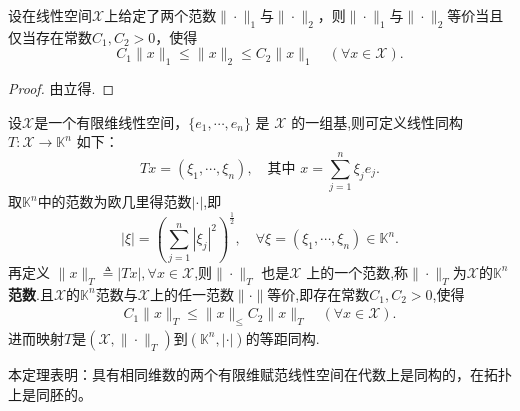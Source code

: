 \documentclass[../../main.tex]{subfiles}%
\begin{document}
\begin{corollary}\label{corollary:范数等价的充要条件}
设在线性空间$\mathscr{X}$上给定了两个范数$\|\cdot\|_1$与$\|\cdot\|_2$，则$\|\cdot\|_1$与$\|\cdot\|_2$等价当且仅当存在常数$C_1,C_2>0$，使得
$$C_1\|x\|_1 \leqslant \|x\|_2 \leqslant C_2\|x\|_1 \quad (\forall x \in \mathscr{X}).$$
\end{corollary}
\begin{proof}
由立得.
\end{proof}

\begin{theorem}\label{theorem:有限维赋范线性空间的范数都等价}
设$\mathscr{X}$是一个有限维线性空间，$\{e_1,\cdots,e_n\}$ 是 $\mathscr{X}$ 的一组基,则可定义线性同构 $T:\mathscr{X}\to\mathbb{K}^n$ 如下：
\[
T x = (\xi_1,\cdots,\xi_n),\quad \text{其中 } x = \sum_{j=1}^n \xi_j e_j.
\]
取$\mathbb{K}^n$中的范数为欧几里得范数$|\cdot|$,即
\[
|\xi| = \left(\sum_{j=1}^n |\xi_j|^2\right)^{\frac{1}{2}},\quad \forall \xi = (\xi_1,\cdots,\xi_n)\in\mathbb{K}^n.
\]
再定义 $\|x\|_T \triangleq |Tx|,\forall x\in \mathscr{X}$,则$\|\cdot\|_T$ 也是$\mathscr{X}$ 上的一个范数,称$\|\cdot\|_T$为$\mathscr{X}$的$\mathbb{K} ^{n}$\textbf{范数}.且$\mathscr{X}$的$\mathbb{K} ^n$范数与$\mathscr{X}$上的任一范数$\|\cdot\|$等价,即存在常数$C_1,C_2>0$,使得
\begin{align*}
C_1\|x\|_T \leqslant \|x\|_ \leqslant C_2\|x\|_T \quad (\forall x \in \mathscr{X}).
\end{align*}
进而映射$T$是$(\mathscr{X},\|\cdot\|_T)$到$(\mathbb{K}^n,|\cdot|)$的等距同构.
\end{theorem}
\begin{remark}
本定理表明：具有相同维数的两个有限维赋范线性空间在代数上是同构的，在拓扑上是同胚的。
\end{remark}
\end{document}
